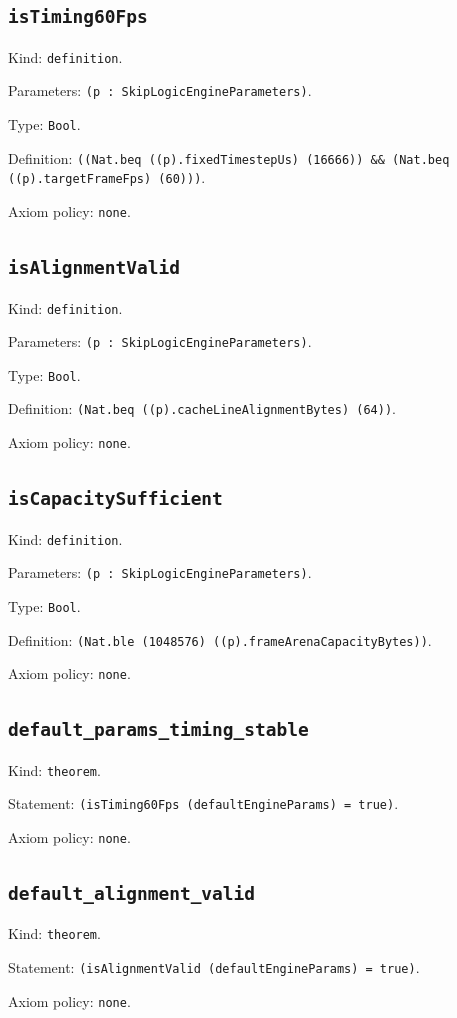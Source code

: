 \documentclass[11pt]{article}
\begin{document}
\subsection*{\texttt{isTiming60Fps}}
\noindent Kind: \texttt{definition}.\par
\noindent Parameters: \texttt{(p : SkipLogicEngineParameters)}.\par
\noindent Type: \texttt{Bool}.\par
\noindent Definition: \texttt{((Nat.beq ((p).fixedTimestepUs) (16666)) \&\& (Nat.beq ((p).targetFrameFps) (60)))}.\par
\noindent Axiom policy: \texttt{none}.\par
\subsection*{\texttt{isAlignmentValid}}
\noindent Kind: \texttt{definition}.\par
\noindent Parameters: \texttt{(p : SkipLogicEngineParameters)}.\par
\noindent Type: \texttt{Bool}.\par
\noindent Definition: \texttt{(Nat.beq ((p).cacheLineAlignmentBytes) (64))}.\par
\noindent Axiom policy: \texttt{none}.\par
\subsection*{\texttt{isCapacitySufficient}}
\noindent Kind: \texttt{definition}.\par
\noindent Parameters: \texttt{(p : SkipLogicEngineParameters)}.\par
\noindent Type: \texttt{Bool}.\par
\noindent Definition: \texttt{(Nat.ble (1048576) ((p).frameArenaCapacityBytes))}.\par
\noindent Axiom policy: \texttt{none}.\par
\subsection*{\texttt{default\_params\_timing\_stable}}
\noindent Kind: \texttt{theorem}.\par
\noindent Statement: \texttt{(isTiming60Fps (defaultEngineParams) = true)}.\par
\noindent Axiom policy: \texttt{none}.\par
\subsection*{\texttt{default\_alignment\_valid}}
\noindent Kind: \texttt{theorem}.\par
\noindent Statement: \texttt{(isAlignmentValid (defaultEngineParams) = true)}.\par
\noindent Axiom policy: \texttt{none}.\par
\end{document}

